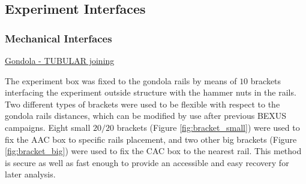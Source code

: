 \subsection{Experiment Interfaces}

\subsubsection{Mechanical Interfaces}
\label{sec:4.2.1}

\bigskip


\underline{Gondola - TUBULAR joining}

\smallskip
The experiment box was fixed to the gondola rails by means of $10$ brackets interfacing the experiment outside structure with the hammer nuts in the rails. Two different types of brackets were used to be flexible with respect to the gondola rails distances, which can be modified by use after previous BEXUS campaigns. Eight small $20/20$ brackets (Figure \ref{fig:bracket_small}) were used to fix the AAC box to specific rails placement, and two other big brackets (Figure \ref{fig:bracket_big}) were used to fix the CAC box to the nearest rail. This method is secure as well as fast enough to provide an accessible and easy recovery for later analysis.

